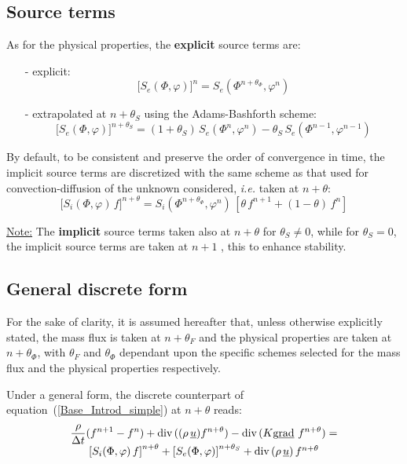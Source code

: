 \subsection{Source terms}

As for the physical properties, the \textbf{explicit} source terms are:

\begin{itemize}
\item[-] explicit:
\begin{equation}
\lbrack S_{e}(\Phi ,\varphi )]^{n}=S_{e}(\Phi ^{n+\theta _{\Phi }},\varphi
^{n})
\end{equation}

\item[-] extrapolated at $n+\theta _{S}$ using the Adams-Bashforth scheme:
\begin{equation}
\lbrack S_{e}(\Phi ,\varphi )]^{n+\theta _{S}}=(1+\theta _{S})\,S_{e}(\Phi
^{n},\varphi ^{n})-\theta _{S}\,S_{e}(\Phi ^{n-1},\varphi ^{n-1})
\end{equation}
\end{itemize}

By default, to be consistent and preserve the order of convergence in time,
the implicit source terms are discretized with the same scheme as that used
for convection-diffusion of the unknown considered, \textit{i.e.} taken at $%
n+\theta $:
\begin{equation}
\lbrack S_{i}(\Phi ,\varphi )\,f]^{n+\theta }=S_{i}(\Phi ^{n+\theta _{\Phi
}},\varphi ^{n})\,[\theta \,f^{n+1}+(1-\theta )\,f^{n}]
\end{equation}

\underline{Note:}\newline
The \textbf{implicit} source terms taken also at $n+\theta $ for $\theta
_{S}\neq 0$, while for $\theta _{S}=0$, the implicit source terms are taken
at $n+1$ , this to enhance stability.

\subsection{General discrete form}

For the sake of clarity, it is assumed hereafter that, unless otherwise
explicitly stated, the mass flux is taken at $n+\theta_F$ and the physical
properties are taken at $n+\theta_\Phi$, with $\theta_F$ and $\theta_\Phi$
dependant upon the specific schemes selected for the mass flux and the
physical properties respectively.

Under a general form, the discrete counterpart of equation~(\ref{Base_Introd_simple}) at
$n+\theta$ reads:
\begin{equation}
\begin{array}{c}
\displaystyle \frac{\rho}{\Delta t}(f^{n+1}-f^{n})+ \dive\,((\rho\,%
\underline{u}) f^{n+\theta})-\dive\,(K \grad f^{n+\theta}) = \\
\left[S_{i}(\Phi,\varphi)\,f\right]^{n+\theta} + \left[S_{e}(\Phi,\varphi)%
\right]^{n+\theta_{S}} + \dive\,(\rho\,\underline{u})\,f^{n+\theta}%
\end{array}%
\end{equation}

